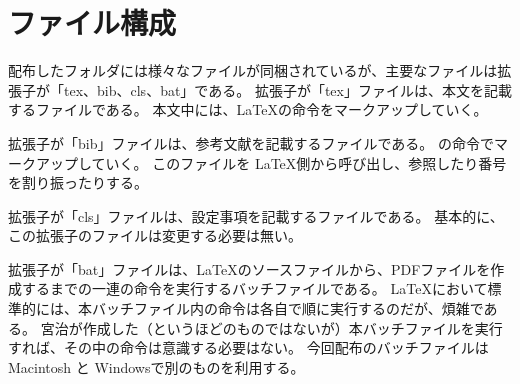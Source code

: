  
\section{ファイル構成}
配布したフォルダには様々なファイルが同梱されているが、主要なファイルは拡張子が「tex、bib、cls、bat」である。
拡張子が「tex」ファイルは、本文を記載するファイルである。
本文中には、\LaTeX の命令をマークアップしていく。

拡張子が「bib」ファイルは、参考文献を記載するファイルである。
\BibTeX の命令でマークアップしていく。
このファイルを \LaTeX 側から呼び出し、参照したり番号を割り振ったりする。

拡張子が「cls」ファイルは、設定事項を記載するファイルである。
基本的に、この拡張子のファイルは変更する必要は無い。

拡張子が「bat」ファイルは、\LaTeX のソースファイルから、PDFファイルを作成するまでの一連の命令を実行するバッチファイルである。
\LaTeX において標準的には、本バッチファイル内の命令は各自で順に実行するのだが、煩雑である。
宮治が作成した（というほどのものではないが）本バッチファイルを実行すれば、その中の命令は意識する必要はない。
今回配布のバッチファイルは Macintosh と Windowsで別のものを利用する。

